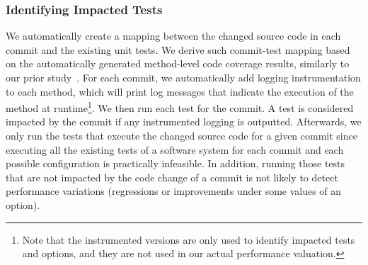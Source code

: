 \subsubsection{Identifying Impacted Tests}
\label{sec:impactedtests}
We automatically create a mapping between the changed source code in each commit and the existing unit tests. %
We derive such commit-test mapping based on the automatically generated method-level code coverage results, similarly to our prior study~\cite{jinfu_tse2020}. 
For each commit, we automatically add logging instrumentation to each  method, which will print log messages that indicate the execution of the method at runtime\footnote{Note that the instrumented versions are only used to identify impacted tests and options, and they are not used in our actual performance valuation.}.
We then run each test for the commit. A test is considered impacted by the commit if any instrumented logging is outputted.
Afterwards, we only run the tests that execute the changed source code for a given commit since executing all the existing tests of a software system for each commit and each possible configuration is practically infeasible. In addition, running those tests that are not impacted by the code change of a commit is not likely to detect performance variations (regressions or improvements under some values of an option). 


